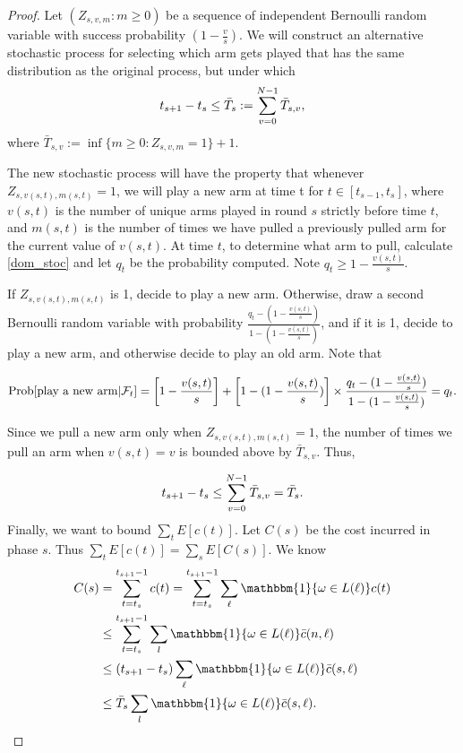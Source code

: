 \begin{proof}
Let $(Z_{s,v,m}:m\geq 0)$ be a sequence of independent Bernoulli random variable with success probability $(1-\frac{v}{s})$. We will construct an alternative stochastic process for selecting which arm gets played that has the same distribution as the original process, but under which
\begin{align}
t_{s+1}-t_{s}\leq \bar{T}_{s}:=\sum_{v=0}^{N-1}\bar{T}_{s,v}, \nonumber 
\end{align}
where $\bar{T}_{s,v}:=\inf\{m\geq 0: Z_{s,v,m}=1\}+1$.

The new stochastic process will have the property that whenever $Z_{s,v(s,t),m(s,t)}=1$, we will play a new arm at time t for $t\in [t_{s-1}, t_{s}]$, where $v(s,t)$ is the number of unique arms played in round $s$ strictly before time $t$, and $m(s,t)$ is the number of times we have pulled a previously pulled arm for the current value of $v(s,t)$. At time $t$, to determine what arm to pull, calculate \eqref{dom_stoc} and let $q_t$ be the probability computed. Note $q_t\geq 1-\frac{v(s,t)}{s}$.

If $Z_{s,v(s,t),m(s,t)}$ is 1, decide to play a new arm. Otherwise, draw a second Bernoulli random variable with probability $\frac{q_t-(1-\frac{v(s,t)}{s})}{1-(1-\frac{v(s,t)}{s})}$, and if it is 1, decide to play a new arm, and otherwise decide to play an old arm. Note that

\begin{align}
\Prob{\text{play a new arm}|\mathcal{F}_{t}}=\left[1-\frac{v(s,t)}{s}\right]+\left[1-(1-\frac{v(s,t)}{s})\right]\times \frac{q_t-(1-\frac{v(s,t)}{s})}{1-(1-\frac{v(s,t)}{s})}=q_t.
\end{align}

Since we pull a new arm only when $Z_{s,v(s,t),m(s,t)}=1$, the number of times we pull an arm when $v(s,t)=v$ is bounded above by $\bar{T}_{s,v}$. Thus,

\begin{align}
t_{s+1}-t_{s}\leq \sum_{v=0}^{N-1}\bar{T}_{s,v}=\bar{T}_{s}.
\end{align}
Finally, we want to bound $\sum_{t}E[c(t)]$. Let $C(s)$ be the cost incurred in phase $s$. Thus $\sum_{t}E[c(t)]=\sum_{s}E[C(s)]$. We know
\begin{align}
C(s)&=\sum_{t=t_s}^{t_{s+1}-1}c(t)=\sum_{t=t_{s}}^{t_{s+1}-1}\sum_{\ell}\mathbbm{1}\{\omega\in L(\ell)\}c(t) \nonumber \\
&\leq \sum_{t=t_{s}}^{t_{s+1}-1}\sum_{l}\mathbbm{1}\{\omega\in L(\ell)\}\bar{c}(n,\ell) \nonumber \\
&\leq (t_{s+1}-t_{s})\sum_{\ell} \mathbbm{1}\{\omega\in L(\ell)\}\bar{c}(s,\ell) \nonumber \\
&\leq \bar{T}_{s}\sum_{l}\mathbbm{1}\{\omega\in L(\ell)\}\bar{c}(s,\ell). \nonumber
\end{align}


\end{proof}
